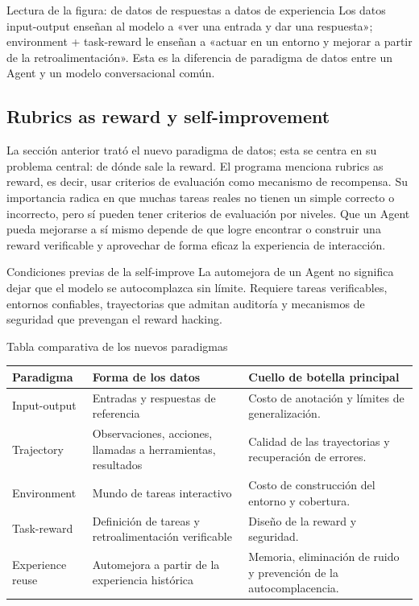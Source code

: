 \documentclass[a4paper]{article}
\begin{document}
\begin{knowledgebox}{Lectura de la figura: de datos de respuestas a datos de experiencia}
Los datos input-output enseñan al modelo a «ver una entrada y dar una respuesta»; environment + task-reward le enseñan a «actuar en un entorno y mejorar a partir de la retroalimentación». Esta es la diferencia de paradigma de datos entre un Agent y un modelo conversacional común.
\end{knowledgebox}

\subsection{Rubrics as reward y self-improvement}

La sección anterior trató el nuevo paradigma de datos; esta se centra en su problema central: de dónde sale la reward. El programa menciona rubrics as reward, es decir, usar criterios de evaluación como mecanismo de recompensa. Su importancia radica en que muchas tareas reales no tienen un simple correcto o incorrecto, pero sí pueden tener criterios de evaluación por niveles. Que un Agent pueda mejorarse a sí mismo depende de que logre encontrar o construir una reward verificable y aprovechar de forma eficaz la experiencia de interacción.

\begin{warningbox}{Condiciones previas de la self-improve}
La automejora de un Agent no significa dejar que el modelo se autocomplazca sin límite. Requiere tareas verificables, entornos confiables, trayectorias que admitan auditoría y mecanismos de seguridad que prevengan el reward hacking.
\end{warningbox}

\begin{knowledgebox}{Tabla comparativa de los nuevos paradigmas}
\begin{tabularx}{\textwidth}{p{}p{}X}
\toprule
Paradigma & Forma de los datos & Cuello de botella principal \\
\midrule
Input-output & Entradas y respuestas de referencia & Costo de anotación y límites de generalización. \\
Trajectory & Observaciones, acciones, llamadas a herramientas, resultados & Calidad de las trayectorias y recuperación de errores. \\
Environment & Mundo de tareas interactivo & Costo de construcción del entorno y cobertura. \\
Task-reward & Definición de tareas y retroalimentación verificable & Diseño de la reward y seguridad. \\
Experience reuse & Automejora a partir de la experiencia histórica & Memoria, eliminación de ruido y prevención de la autocomplacencia. \\
\bottomrule
\end{tabularx}
\end{knowledgebox}
\end{document}
